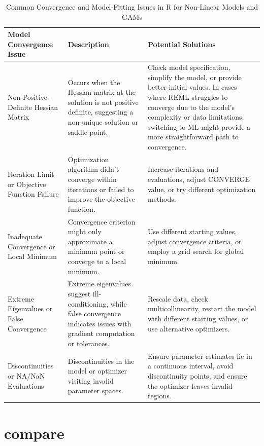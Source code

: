 \documentclass[12pt, twoside,hidelinks]{article}
\theoremstyle{definition}
\numberwithin{equation}{section}
\begin{document}
\begin{table}[H]
\centering
\begin{tabular}{>{\raggedright}p{4.5cm} >{\raggedright}p{6cm} >{\raggedright\arraybackslash}p{5.5cm}}
\toprule
\textbf{Model Convergence Issue} & \textbf{Description} & \textbf{Potential Solutions} \\
\midrule
Non-Positive-Definite Hessian Matrix & Occurs when the Hessian matrix at the solution is not positive definite, suggesting a non-unique solution or saddle point. & Check model specification, simplify the model, or provide better initial values. In cases where REML struggles to converge due to the model's complexity or data limitations, switching to ML might provide a more straightforward path to convergence. \\
\addlinespace
Iteration Limit or Objective Function Failure & Optimization algorithm didn't converge within iterations or failed to improve the objective function. & Increase iterations and evaluations, adjust CONVERGE value, or try different optimization methods. \\
\addlinespace
Inadequate Convergence or Local Minimum & Convergence criterion might only approximate a minimum point or converge to a local minimum. & Use different starting values, adjust convergence criteria, or employ a grid search for global minimum. \\
\addlinespace
Extreme Eigenvalues or False Convergence & Extreme eigenvalues suggest ill-conditioning, while false convergence indicates issues with gradient computation or tolerances. & Rescale data, check multicollinearity, restart the model with different starting values, or use alternative optimizers. \\
\addlinespace
Discontinuities or NA/NaN Evaluations & Discontinuities in the model or optimizer visiting invalid parameter spaces. & Ensure parameter estimates lie in a continuous interval, avoid discontinuity points, and ensure the optimizer leaves invalid regions. \\
\bottomrule
\end{tabular}
\caption{Common Convergence and Model-Fitting Issues in R for Non-Linear Models and GAMs}
\label{tab:model_convergence_combined}
\end{table}




\newpage

\section{compare}
\end{document}
